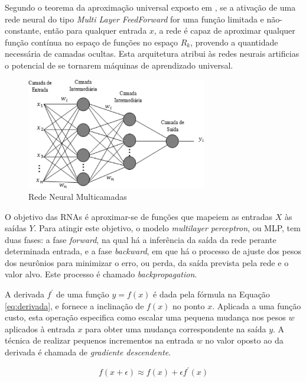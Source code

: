 Segundo o teorema da aproximação universal exposto em \cite{hornik1991approximation}, se a ativação de uma rede neural do tipo \emph{Multi Layer FeedForward} for uma função limitada e não-constante, então para qualquer entrada $x$, a rede é capaz de aproximar qualquer função contínua no espaço de funções no espaço $R_k$, provendo a quantidade necessária de camadas ocultas. Esta arquitetura atribui às redes neurais artificias o potencial de se tornarem máquinas de aprendizado universal.


\begin{figure}[ht]
	\centering
	\includegraphics[width=0.7\textwidth]{img/mlprna.jpg}
	\caption{Rede Neural Multicamadas}
	\label{fig:mlp}
\end{figure}

O objetivo das RNAs é aproximar-se de funções que mapeiem as entradas $X$ às saídas $Y$. Para atingir este objetivo, o modelo \emph{multilayer perceptron}, ou MLP, tem duas fases: a fase \emph{forward}, na qual há a inferência da saída da rede perante determinada entrada, e a fase \emph{backward}, em que há o processo de ajuste dos pesos dos neurônios para minimizar o erro, ou perda, da saída prevista pela rede e o valor alvo. Este processo é chamado \emph{backpropagation}.

A derivada $f^\prime$ de uma função $y = f(x)$ é dada pela fórmula na Equação \ref{eq:derivada}, e fornece a inclinação de $f(x)$ no ponto $x$. Aplicada a uma função custo, esta operação especifica como escalar uma pequena mudança nos pesos $w$ aplicados à entrada $x$ para obter uma mudança correspondente na saída $y$. A técnica de realizar pequenos incrementos na entrada $w$ no valor oposto ao da derivada é chamada de \emph{gradiente descendente}.

\begin{equation}\label{eq:derivada}
	f(x+\epsilon) \approx f(x) + \epsilon f^\prime(x)
\end{equation}

